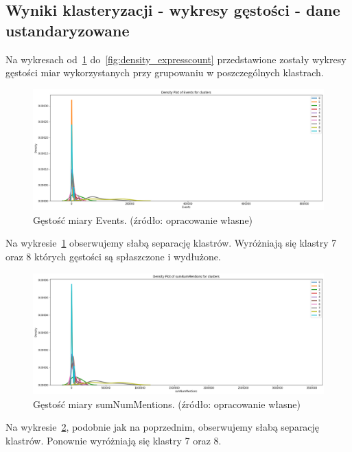 \documentclass[11pt]{report}
\begin{document}
    \subsection{Wyniki klasteryzacji - wykresy gęstości - dane ustandaryzowane}
    Na wykresach od~\ref{fig:density_events} do~\ref{fig:density_expresscount} przedstawione zostały wykresy gęstości miar wykorzystanych przy grupowaniu w poszczególnych klastrach.

    \begin{figure}[!htp]
        \centering
        \includegraphics[width=\linewidth]{fig/CLUST/density_Events.png}
        \caption{Gęstość miary Events. (źródło: opracowanie własne)}
        \label{fig:density_events}
    \end{figure}

    Na wykresie~\ref{fig:density_events} obserwujemy słabą separację klastrów.
    Wyróżniają się klastry 7 oraz 8 których gęstości są spłaszczone i wydłużone.

    \begin{figure}[!htp]
        \centering
        \includegraphics[width=\linewidth]{fig/CLUST/density_sumNumMentions.png}
        \caption{Gęstość miary sumNumMentions. (źródło: opracowanie własne)}
        \label{fig:density_sumnummentions}
    \end{figure}

    Na wykresie~\ref{fig:density_sumnummentions}, podobnie jak na poprzednim, obserwujemy słabą separację klastrów.
    Ponownie wyróżniają się klastry 7 oraz 8.
\end{document}

